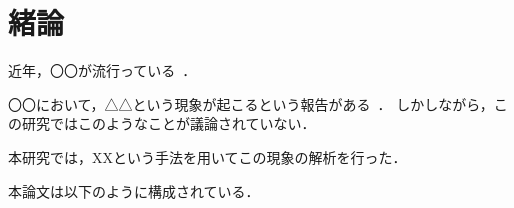 \chapter{緒論}\label{chap:1_intro}
近年，〇〇が流行っている~\cite{circle}．

〇〇において，△△という現象が起こるという報告がある~\cite{triangle}．
しかしながら，この研究ではこのようなことが議論されていない．

本研究では，XXという手法を用いてこの現象の解析を行った．

本論文は以下のように構成されている．
